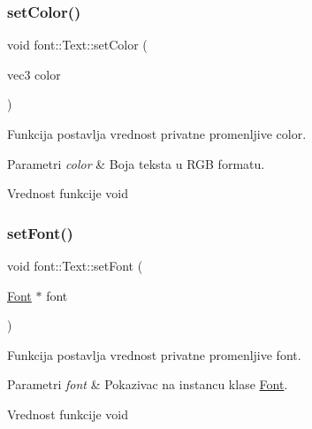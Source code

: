 \subsubsection{\texorpdfstring{set\+Color()}{setColor()}}
{\footnotesize\ttfamily void font\+::\+Text\+::set\+Color (\begin{DoxyParamCaption}\item[{vec3}]{color }\end{DoxyParamCaption})}



Funkcija postavlja vrednost privatne promenljive color. 


\begin{DoxyParams}{Parametri}
{\em color} & Boja teksta u R\+GB formatu. \\
\hline
\end{DoxyParams}
\begin{DoxyReturn}{Vrednost funkcije}
void 
\end{DoxyReturn}
\mbox{\label{classfont_1_1Text_a0011424ac1cb959e601463e48c8e58dd}} 
\subsubsection{\texorpdfstring{set\+Font()}{setFont()}}
{\footnotesize\ttfamily void font\+::\+Text\+::set\+Font (\begin{DoxyParamCaption}\item[{\hyperlink{classfont_1_1Font}{Font} $\ast$}]{font }\end{DoxyParamCaption})}



Funkcija postavlja vrednost privatne promenljive font. 


\begin{DoxyParams}{Parametri}
{\em font} & Pokazivac na instancu klase \hyperlink{classfont_1_1Font}{Font}. \\
\hline
\end{DoxyParams}
\begin{DoxyReturn}{Vrednost funkcije}
void 
\end{DoxyReturn}
\mbox{\label{classfont_1_1Text_adf4bb1e9486fcb905ec62a6ad776dbde}} 
